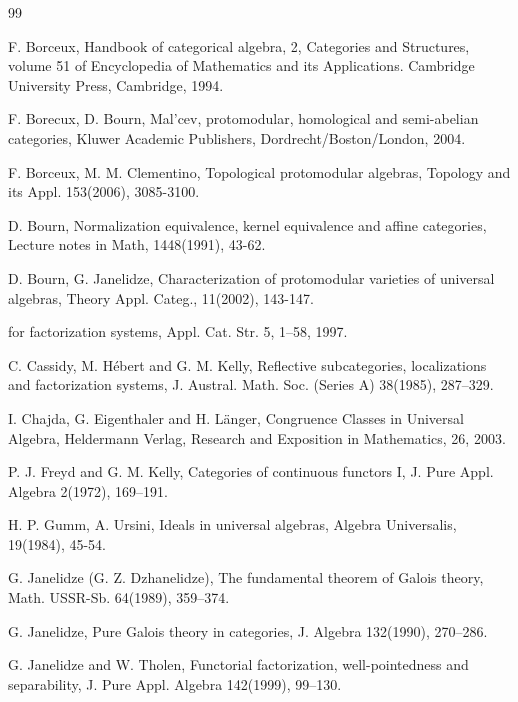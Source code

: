 \documentclass[12pt,reqno,intlim]{amsart}
\numberwithin{equation}{section}
\theoremstyle{definition}
\theoremstyle{remark}
\begin{document}
\begin{thebibliography}{99}





 F. Borceux, Handbook of categorical algebra, 2, Categories and Structures, volume 51 of Encyclopedia of Mathematics and its Applications. Cambridge University Press, Cambridge, 1994.

 F. Borecux, D. Bourn, Mal'cev, protomodular, homological and semi-abelian categories, Kluwer Academic Publishers, Dordrecht/Boston/London, 2004.

 F. Borceux, M. M. Clementino, Topological protomodular algebras, Topology and its Appl. 153(2006), 3085-3100.

 D. Bourn, Normalization equivalence, kernel equivalence and affine categories,
Lecture notes in Math, 1448(1991), 43-62.

 D. Bourn, G. Janelidze, Characterization of protomodular varieties of universal
algebras, Theory Appl. Categ., 11(2002), 143-147.

for factorization systems, Appl. Cat. Str. 5, 1–58, 1997.

 C. Cassidy, M. H\'{e}bert and G. M. Kelly, Reflective subcategories, localizations and
factorization systems, J. Austral. Math. Soc. (Series A) 38(1985), 287–329.

 I. Chajda, G. Eigenthaler and H. L\"anger, Congruence Classes in Universal
Algebra, Heldermann Verlag, Research and Exposition in Mathematics, 26, 2003.

 P. J. Freyd and G. M. Kelly, Categories of continuous functors I, J. Pure Appl.
Algebra 2(1972), 169–191.

 H. P. Gumm, A. Ursini, Ideals in universal algebras, Algebra Universalis,
19(1984), 45-54.

 G. Janelidze (G. Z. Dzhanelidze), The fundamental theorem of Galois theory, Math.
USSR-Sb. 64(1989), 359–374.

 G. Janelidze, Pure Galois theory in categories, J. Algebra 132(1990), 270–286.

 G. Janelidze and W. Tholen, Functorial factorization, well-pointedness and separability,
J. Pure Appl. Algebra 142(1999), 99–130.


\end{thebibliography}
\end{document}
